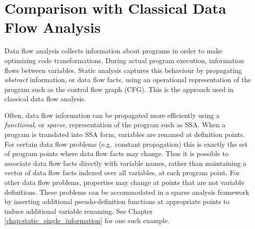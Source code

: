 


\section{Comparison with Classical Data Flow Analysis}
\label{sec:vanilla:dfa}


Data flow analysis collects information about programs
in order to make optimizing code transformations.
During actual program execution, information flows between
variables. Static analysis captures
this behaviour by propagating \textit{abstract} information,
or data flow facts,
using an operational representation of the 
program such as the control flow graph (CFG).
This is the approach used in 
classical data flow analysis.

Often, data flow information can be propagated more efficiently
using a \textit{functional}, or \textit{sparse},
representation of the program such 
as SSA.
When a program is translated into SSA form,
variables are renamed at definition points.
For certain data flow problems (e.g.\ constant propagation)
this is exactly the set of program points where data flow
facts may change.
Thus it is possible to associate data flow facts directly with 
variable names, rather than
maintaining a vector of data flow facts indexed over all variables,
at each program point.
For other data flow problems, properties may 
change at points that are not variable definitions.
These problems can be accommodated in a sparse analysis framework
by inserting additional pseudo-definition functions at appropriate 
points
to induce additional variable renaming. 
See Chapter \ref{chap:static_single_information}
for one such example.


